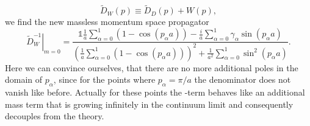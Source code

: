 \begin{equation}
\widetilde{D}_{W}(p) \equiv \widetilde{D}_{D}(p) + W(p),
\end{equation}
we find the new massless momentum space propagator
\begin{equation}
\left. \widetilde{D}_{W}^{-1}\right\vert_{m=0} = \dfrac{\mathds{1}\tfrac{1}{a}\sum_{\alpha=0}^{1}\left( 1- \cos(p_{\alpha}a)\right) - \tfrac{i}{a}\sum_{\alpha=0}^{1}\gamma_{\alpha} \sin(p_{\alpha}a) }{\left(\tfrac{1}{a}\sum_{\alpha=0}^{1}\left( 1- \cos(p_{\alpha}a)\right)\right)^{2} + \tfrac{1}{a^2}\sum_{\alpha=0}^{1}\sin^2(p_{\alpha}a) }.
\end{equation}
Here we can convince ourselves, that there are no more additional poles in the domain of $p_{\alpha}$, since for the points where $p_{\alpha}=\pi/a$ the denominator does not vanish like before. Actually for these points the -term behaves like an additional mass term that is growing infinitely in the continuum limit and consequently decouples from the theory.
%
%
%
%
%
%
%
%
